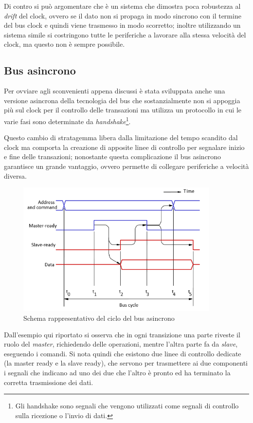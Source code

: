\documentclass[class=book, crop=false, oneside]{standalone}
\begin{document}
Di contro si può argomentare che è un sistema che dimostra poca robustezza al \emph{drift} del clock, ovvero se il dato non si propaga in modo sincrono con il  termine del bus clock e quindi viene trasmesso in modo scorretto; inoltre utilizzando un sistema simile si costringono tutte le periferiche a lavorare alla stessa velocità del clock, ma questo non è sempre possibile.

\subsection{Bus asincrono}
Per ovviare agli sconvenienti appena discussi è stata sviluppata anche una versione asincrona della tecnologia del bus che sostanzialmente non si appoggia più sul clock per il controllo delle transazioni ma utilizza un protocollo in cui le varie fasi sono determinate da \emph{handshake}\footnote{Gli handshake sono segnali che vengono utilizzati come segnali di controllo sulla ricezione o l'invio di dati.}.

Questo cambio di stratagemma libera dalla limitazione del tempo scandito dal clock ma comporta la creazione di apposite linee di controllo per segnalare inizio e fine delle transazioni;
nonostante questa complicazione il bus asincrono garantisce un grande vantaggio, ovvero permette di collegare periferiche a velocità diversa.

\begin{figure}[!h]
	\centering
	\includegraphics[width=0.9\textwidth,keepaspectratio]{bus-asincrono}
	\caption{Schema rappresentativo del ciclo del bus asincrono}
\end{figure}
Dall'esempio qui riportato si osserva che in ogni transizione una parte riveste il ruolo del \emph{master}, richiedendo delle operazioni, mentre l'altra parte fa da \emph{slave}, eseguendo i comandi.
Si nota quindi che esistono due linee di controllo dedicate (la master ready e la slave ready), che servono per trasmettere ai due componenti i segnali che indicano ad uno dei due che l'altro è pronto ed ha terminato la corretta trasmissione dei dati.
\end{document}
